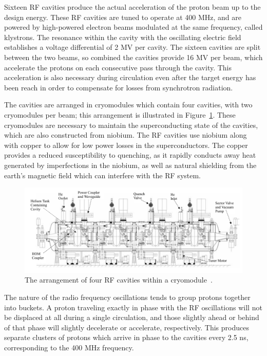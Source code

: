 Sixteen \ac{RF} cavities produce the  actual acceleration of the proton beam up to the design energy.
These \ac{RF} cavities are tuned to operate at 400 MHz, and are powered by high-powered electron beams modulated at the same frequency, called klystrons.
The resonance within the cavity with the oscillating electric field establishes a voltage differential of 2 MV per cavity.
The sixteen cavities are split between the two beams, so combined the cavities provide 16 MV per beam, which accelerate the protons on each consecutive pass through the cavity.
This acceleration is also necessary during circulation even after the target energy has been reach in order to compensate for losses from synchrotron radiation.

The cavities are arranged in cryomodules which contain four cavities, with two cryomodules per beam; this arrangement is illustrated in Figure~\ref{fig:rfcavity}.
These cryomodules are necessary to maintain the superconducting state of the cavities, which are also constructed from niobium.
The \ac{RF} cavities use niobium along with copper to allow for low power losses in the superconductors.
The copper provides a reduced susceptibility to quenching, as it rapidly conducts away heat generated by imperfections in the niobium, as well as natural shielding from the earth's magnetic field which can interfere with the \ac{RF} system.

\begin{figure}
\centering
\includegraphics[width=\fullfig]{figures/rfcavity.png}
\caption{The arrangement of four \acs*{RF} cavities within a cryomodule~\cite{lhc_machine}.}
\label{fig:rfcavity}
\end{figure}

The nature of the radio frequency oscillations tends to group protons together into buckets.
A proton traveling exactly in phase with the \ac{RF} oscillations will not be displaced at all during a single circulation, and those slightly ahead or behind of that phase will slightly decelerate or accelerate, respectively.
This produces separate clusters of protons which arrive in phase to the cavities every 2.5 ns, corresponding to the 400 MHz frequency.

